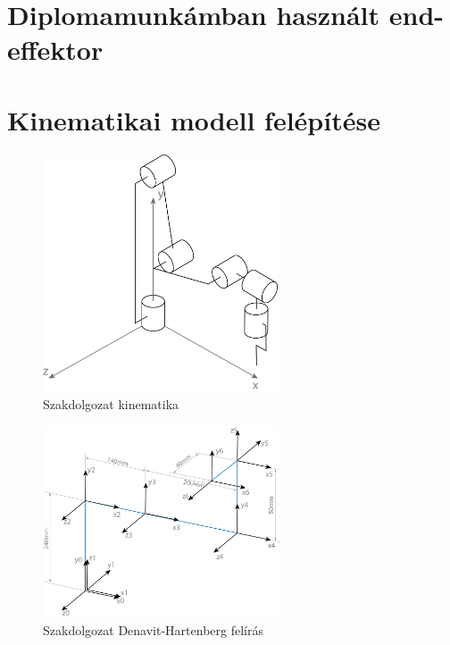 \section{Diplomamunkámban használt end-effektor}


\section{Kinematikai modell felépítése}

\begin{figure}[!ht]
\centering
\includegraphics[width=70mm, keepaspectratio]{figures/Szakdoga/kinematik_v_2}
\caption{Szakdolgozat kinematika}
\label{fig:Csuklo_2}
\end{figure}

\begin{figure}[!ht]
\centering
\includegraphics[width=70mm, keepaspectratio]{figures/Szakdoga/v_2_dh}
\caption{Szakdolgozat Denavit-Hartenberg felírás}
\label{fig:Csuklo_3}
\end{figure}


